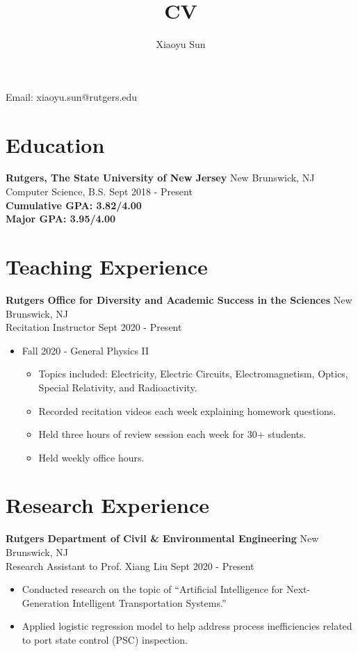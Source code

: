 \documentclass{article}
\makeatletter
\renewcommand{\maketitle}{
\begin{center}
{\huge\bfseries
\theauthor}

\vspace{.25em}

Email: xiaoyu.sun@rutgers.edu\\
\end{center}
}
\makeatother
\begin{document}
\title{CV}
\author{Xiaoyu Sun}
\maketitle

\section{Education}
\textbf{Rutgers, The State University of New Jersey} \space 
\hfill{New Brunswick, NJ}\\
Computer Science, B.S. \space
\hfill{Sept 2018 - Present}\\
\textbf{Cumulative GPA: 3.82/4.00}\\
\textbf{Major GPA: 3.95/4.00}


\section{Teaching Experience}
\textbf{Rutgers Office for Diversity and Academic Success in the Sciences}
\hfill{New Brunswick, NJ}\\
Recitation Instructor
\hfill{Sept 2020 - Present}
\begin{itemize}
  \item Fall 2020 - General Physics II
  \begin{itemize}
  	\item Topics included: Electricity, Electric Circuits, Electromagnetism, Optics, Special Relativity, and Radioactivity.
     \item Recorded recitation videos each week explaining homework questions.
     \item Held three hours of review session each week for 30+ students.
 	 \item Held weekly office hours.
  \end{itemize}
\end{itemize}


\section{Research Experience}
\textbf{Rutgers Department of Civil \& Environmental Engineering}
\hfill{New Brunswick, NJ}\\
Research Assistant to Prof. Xiang Liu
\hfill{Sept 2020 - Present}
\begin{itemize}
  \itemsep0em
  \item Conducted research on the topic of “Artificial Intelligence for Next-Generation Intelligent Transportation Systems.”
  \item Applied logistic regression model to help address process inefficiencies related to port state control (PSC) inspection.
\end{itemize}
\end{document}
